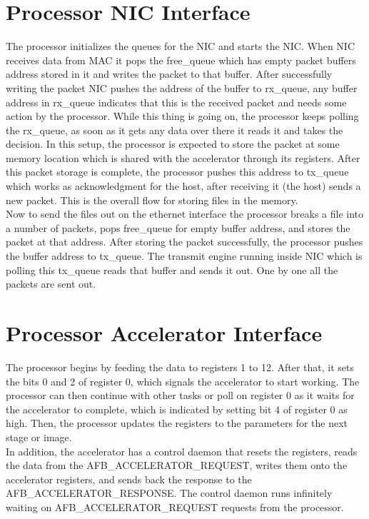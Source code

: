 \documentclass[12pt]{report}
\begin{document}
\section{Processor NIC Interface}

The processor initializes the queues for the NIC and starts the NIC. When NIC receives data from MAC it pops the free\_queue which has empty packet buffers address stored in it and writes the packet to that buffer. After successfully writing the packet NIC pushes the address of the buffer to rx\_queue, any buffer address in rx\_queue indicates that this is the received packet and needs some action by the processor. While this thing is going on, the processor keeps polling the rx\_queue, as soon as it gets any data over there it reads it and takes the decision. In this setup, the processor is expected to store the packet at some memory location which is shared with the accelerator through its registers. After this packet storage is complete, the processor pushes this address to tx\_queue which works as acknowledgment for the host, after receiving it (the host) sends a new packet. This is the overall flow for storing files in the memory.
\\

Now to send the files out on the ethernet interface the processor breaks a file into a number of packets, pops free\_queue for empty buffer address, and stores the packet at that address. After storing the packet successfully, the processor pushes the buffer address to tx\_queue. The transmit engine running inside NIC which is polling this tx\_queue reads that buffer and sends it out. One by one all the packets are sent out.



\section{Processor Accelerator Interface}

The processor begins by feeding the data to registers 1 to 12. After that, it sets the bits 0 and 2 of register 0, which signals the accelerator to start working. The processor can then continue with other tasks or poll on register 0 as it waits for the accelerator to complete, which is indicated by setting bit 4 of register 0 as high. Then, the processor updates the registers to the parameters for the next stage or image.
\\

In addition, the accelerator has a control daemon that resets the registers, reads the data from the AFB\_ACCELERATOR\_REQUEST, writes them onto the accelerator registers, and sends back the response to the AFB\_ACCELERATOR\_RESPONSE. The control daemon runs infinitely waiting on AFB\_ACCELERATOR\_REQUEST requests from the processor.
\\
\end{document}
